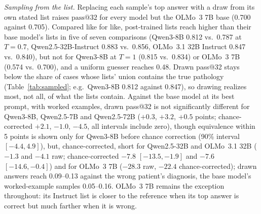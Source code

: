 \documentclass[wcp]{jmlr}
\makeatletter
\newcommand{\passk}[1]{\mathrm{pass@}#1}
\makeatother
\begin{document}
\emph{Sampling from the list.} Replacing each sample's top answer with a draw from its own stated list raises $\passk{32}$ for every model but the OLMo~3 7B base (0.700 against 0.705). Compared like for like, post-trained lists reach higher than their base model's lists in five of seven comparisons (Qwen3-8B 0.812 vs.\ 0.787 at $T{=}0.7$, Qwen2.5-32B-Instruct 0.883 vs.\ 0.856, OLMo~3.1 32B Instruct 0.847 vs.\ 0.840), but not for Qwen3-8B at $T{=}1$ (0.815 vs.\ 0.834) or OLMo~3 7B (0.574 vs.\ 0.700), and a uniform guesser reaches 0.48. Drawn pass@32 stays below the share of cases whose lists' union contains the true pathology (Table~\ref{tab:sampled}; e.g.\ Qwen3-8B 0.812 against 0.847), so drawing realizes most, not all, of what the lists contain. Against the base model at its best prompt, with worked examples, drawn pass@32 is not significantly different for Qwen3-8B, Qwen2.5-7B and Qwen2.5-72B ($+0.3$, $+3.2$, $+0.5$ points; chance-corrected $+2.1$, $-1.0$, $-4.5$, all intervals include zero), though equivalence within 5 points is shown only for Qwen3-8B before chance correction (90\% interval $[-4.4,4.9]$), but, chance-corrected, short for Qwen2.5-32B and OLMo~3.1 32B ($-1.3$ and $-4.1$ raw; chance-corrected $-7.8$ $[-13.5,-1.9]$ and $-7.6$ $[-14.6,-0.4]$) and for OLMo~3 7B ($-28.3$ raw, $-22.4$ chance-corrected); drawn answers reach 0.09--0.13 against the wrong patient's diagnosis, the base model's worked-example samples 0.05--0.16.
OLMo~3 7B remains the exception throughout: its Instruct list is closer to the reference when its top answer is correct but much farther when it is wrong.
\end{document}
